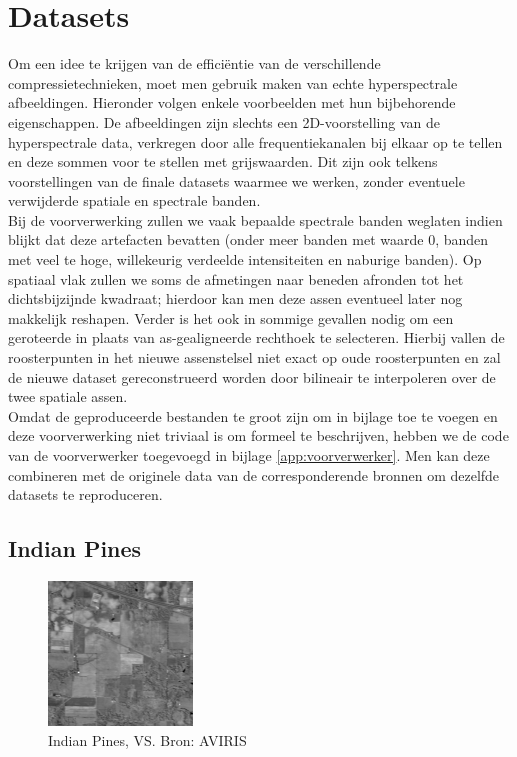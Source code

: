 \section{Datasets}

Om een idee te krijgen van de effici\"entie van de verschillende compressietechnieken, moet men gebruik maken van echte hyperspectrale afbeeldingen. Hieronder volgen enkele voorbeelden met hun bijbehorende eigenschappen. De afbeeldingen zijn slechts een 2D-voorstelling van de hyperspectrale data, verkregen door alle frequentiekanalen bij elkaar op te tellen en deze sommen voor te stellen met grijswaarden. Dit zijn ook telkens voorstellingen van de finale datasets waarmee we werken, zonder eventuele verwijderde spatiale en spectrale banden.\\

Bij de voorverwerking zullen we vaak bepaalde spectrale banden weglaten indien blijkt dat deze artefacten bevatten (onder meer banden met waarde 0, banden met veel te hoge, willekeurig verdeelde intensiteiten en naburige banden). Op spatiaal vlak zullen we soms de afmetingen naar beneden afronden tot het dichtsbijzijnde kwadraat; hierdoor kan men deze assen eventueel later nog makkelijk reshapen. Verder is het ook in sommige gevallen nodig om een geroteerde in plaats van as-gealigneerde rechthoek te selecteren. Hierbij vallen de roosterpunten in het nieuwe assenstelsel niet exact op oude roosterpunten en zal de nieuwe dataset gereconstrueerd worden door bilineair te interpoleren \cite{ref:bilinear_interpolation} over de twee spatiale assen.\\

Omdat de geproduceerde bestanden te groot zijn om in bijlage toe te voegen en deze voorverwerking niet triviaal is om formeel te beschrijven, hebben we de code van de voorverwerker toegevoegd in bijlage \ref{app:voorverwerker}. Men kan deze combineren met de originele data van de corresponderende bronnen om dezelfde datasets te reproduceren.

\subsection{Indian Pines}

\begin{figure}[H]
  \centering
  \includegraphics[scale=1]{images/indian_pines_sum.png}
  \caption{Indian Pines, VS. Bron: AVIRIS \cite{ref:ehu_aviris_indian_pines}}
  \label{fig:indian_pines_sum}
\end{figure}

